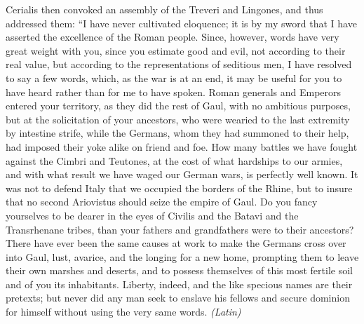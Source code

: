 Cerialis then convoked an assembly of the Treveri and Lingones, and thus addressed them: ``I have never cultivated eloquence; it is by my sword that I have asserted the excellence of the Roman people. Since, however, words have very great weight with you, since you estimate good and evil, not according to their real value, but according to the representations of seditious men, I have resolved to say a few words, which, as the war is at an end, it may be useful for you to have heard rather than for me to have spoken. Roman generals and Emperors entered your territory, as they did the rest of Gaul, with no ambitious purposes, but at the solicitation of your ancestors, who were wearied to the last extremity by intestine strife, while the Germans, whom they had summoned to their help, had imposed their yoke alike on friend and foe. How many battles we have fought against the Cimbri and Teutones, at the cost of what hardships to our armies, and with what result we have waged our German wars, is perfectly well known. It was not to defend Italy that we occupied the borders of the Rhine, but to insure that no second Ariovistus should seize the empire of Gaul. Do you fancy yourselves to be dearer in the eyes of Civilis and the Batavi and the Transrhenane tribes, than your fathers and grandfathers were to their ancestors? There have ever been the same causes at work to make the Germans cross over into Gaul, lust, avarice, and the longing for a new home, prompting them to leave their own marshes and deserts, and to possess themselves of this most fertile soil and of you its inhabitants. Liberty, indeed, and the like specious names are their pretexts; but never did any man seek to enslave his fellows and secure dominion for himself without using the very same words. \emph{(Latin)}


